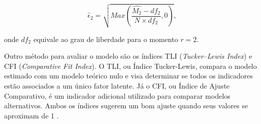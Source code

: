 \[
	\hat{\epsilon}_2 = \sqrt{Max\left(\frac{\hat{M_{2}} - df_{2}}
		{N \times df_{2}}, 0 \right) } ,
\]

\noindent onde $df_2$ equivale ao grau de liberdade para o momento $r = 2$.



\begin{comment}
	Outro método método para avaliar o modelo são os índices TLI  (\textit{Tucker–Lewis Index}) e CFI (\textit{Comparative Fit Index}), TLI significa Índice Tucker-Lewis e CFI significa Índice de Ajuste Comparativo. O TLI  compara o modelo estimado com um modelo teórico nulo e visa determinar se todos os indicadores são
	associados a um único fator latente, o CFI é um indicador adicional que serve para comparar modelos alternativos \cite{boruchovitch2017dark}. Ambos os indicadores indicam modelos com bom ajustes quando seu valor próximos de 1 \cite{hair2009multivariada}). 
\end{comment}


Outro método para avaliar o modelo são os índices TLI (\textit{Tucker–Lewis Index}) e CFI (\textit{Comparative Fit Index}). O TLI, ou Índice Tucker-Lewis, compara o modelo estimado com um modelo teórico nulo e visa determinar se todos os indicadores estão associados a um único fator latente. Já o CFI, ou Índice de Ajuste Comparativo, é um indicador adicional utilizado para comparar modelos alternativos. Ambos os índices sugerem um bom ajuste quando seus valores se aproximam de 1 \cite{hair2009multivariada}.

